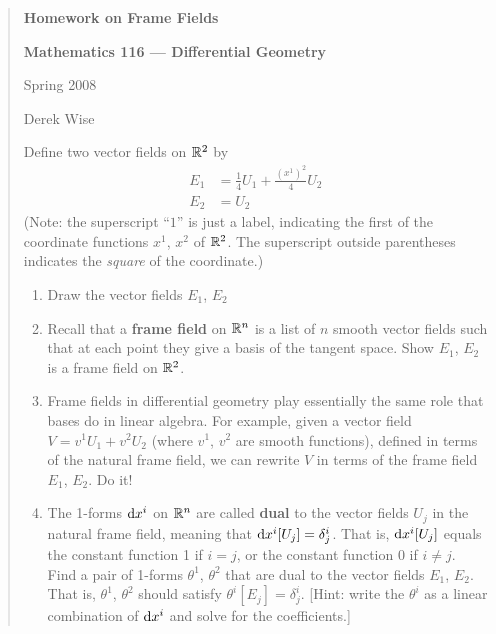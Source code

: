 \begin{framed}
\begin{quotation}
  \begin{center}
    {\large\bfseries Homework on Frame Fields}\medbreak

    \textbf{Mathematics 116 --- Differential Geometry}

    Spring 2008

    Derek Wise
  \end{center}

  Define two vector fields on $\mathbb{R}^{2}$ by
\begin{align*}
E_{1} &= \frac{1}{4}U_{1} + \frac{(x^{1})^{2}}{4}U_{2}\\
E_{2} &= U_{2}
\end{align*}
(Note: the superscript ``$1$'' is just a label, indicating the first of
the coordinate functions $x^{1}$, $x^{2}$ of $\mathbb{R}^{2}$. The superscript
outside parentheses indicates the \emph{square} of the coordinate.)
\begin{enumerate}
\item Draw the vector fields $E_{1}$, $E_{2}$
\item Recall that a \textbf{frame field} on $\mathbb{R}^{n}$ is a list of $n$
  smooth vector fields such that at each point they give a basis of the
  tangent space. Show $E_{1}$, $E_{2}$ is a frame field on $\mathbb{R}^{2}$.
\item Frame fields in differential geometry play essentially the same
  role that bases do in linear algebra. For example, given a vector
  field $V = v^{1}U_{1} + v^{2}U_{2}$ (where $v^{1}$, $v^{2}$ are smooth
  functions), defined in terms of the natural frame field, we can
  rewrite $V$ in terms of the frame field $E_{1}$, $E_{2}$. Do it!
\item The 1-forms $\mathrm{d} x^{i}$ on $\mathbb{R}^{n}$ are called \textbf{dual} to
  the vector fields $U_{j}$ in the natural frame field, meaning that $\mathrm{d} x^{i}[U_{j}]=\delta^{i}_{j}$.
  That is, $\mathrm{d} x^{i}[U_{j}]$ equals the constant function 1 if $i=j$, or
  the constant function 0 if $i\neq j$. Find a pair of 1-forms
  $\theta^{1}$, $\theta^{2}$ that are dual to the vector fields $E_{1}$,
  $E_{2}$. That is, $\theta^{1}$, $\theta^{2}$ should satisfy
  $\theta^{i}[E_{j}]=\delta^{i}_{j}$. [Hint: write the $\theta^{i}$ as a
    linear combination of $\mathrm{d} x^{i}$ and solve for the coefficients.]
\end{enumerate}
\end{quotation}
\end{framed}
